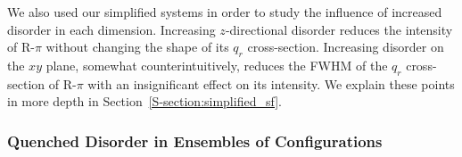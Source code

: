  
  We also used our simplified systems in order to study the influence of increased
  disorder in each dimension. Increasing $z$-directional disorder reduces the
  intensity of R-$\pi$ without changing the shape of its $q_r$ cross-section.
  Increasing disorder on the $xy$ plane, somewhat counterintuitively, reduces
  the FWHM of the $q_r$ cross-section of R-$\pi$ with an insignificant effect
  on its intensity. We explain these points in more depth in 
  Section~\ref{S-section:simplified_sf}.

%
  
  \subsubsection{Quenched Disorder in Ensembles of Configurations}  

